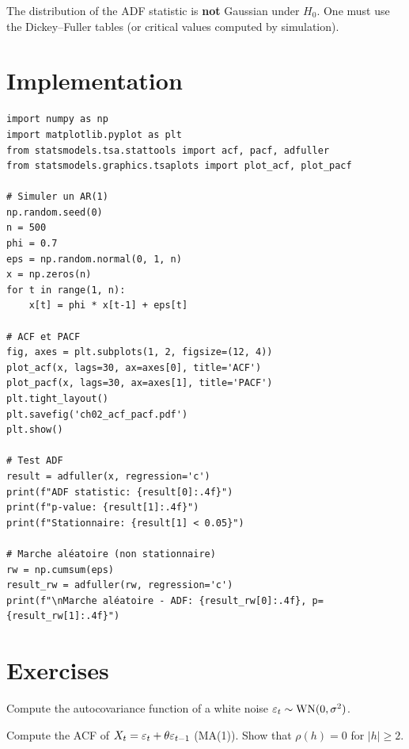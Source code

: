 \begin{warning}
The distribution of the ADF statistic is \textbf{not} Gaussian under $H_0$. One must use the Dickey--Fuller tables (or critical values computed by simulation).
\end{warning}

\section{Implementation}

\begin{codeblock}[title=\textbf{Python}]
\begin{verbatim}
import numpy as np
import matplotlib.pyplot as plt
from statsmodels.tsa.stattools import acf, pacf, adfuller
from statsmodels.graphics.tsaplots import plot_acf, plot_pacf

# Simuler un AR(1)
np.random.seed(0)
n = 500
phi = 0.7
eps = np.random.normal(0, 1, n)
x = np.zeros(n)
for t in range(1, n):
    x[t] = phi * x[t-1] + eps[t]

# ACF et PACF
fig, axes = plt.subplots(1, 2, figsize=(12, 4))
plot_acf(x, lags=30, ax=axes[0], title='ACF')
plot_pacf(x, lags=30, ax=axes[1], title='PACF')
plt.tight_layout()
plt.savefig('ch02_acf_pacf.pdf')
plt.show()

# Test ADF
result = adfuller(x, regression='c')
print(f"ADF statistic: {result[0]:.4f}")
print(f"p-value: {result[1]:.4f}")
print(f"Stationnaire: {result[1] < 0.05}")

# Marche aléatoire (non stationnaire)
rw = np.cumsum(eps)
result_rw = adfuller(rw, regression='c')
print(f"\nMarche aléatoire - ADF: {result_rw[0]:.4f}, p={result_rw[1]:.4f}")
\end{verbatim}
\end{codeblock}

\section{Exercises}

\begin{exercise}[$\star$]
Compute the autocovariance function of a white noise $\varepsilon_t\sim\mathrm{WN}(0,\sigma^2)$.
\end{exercise}

\begin{exercise}[$\star$]
Compute the ACF of $X_t = \varepsilon_t + \theta\varepsilon_{t-1}$ (MA(1)). Show that $\rho(h)=0$ for $|h|\geq 2$.
\end{exercise}

